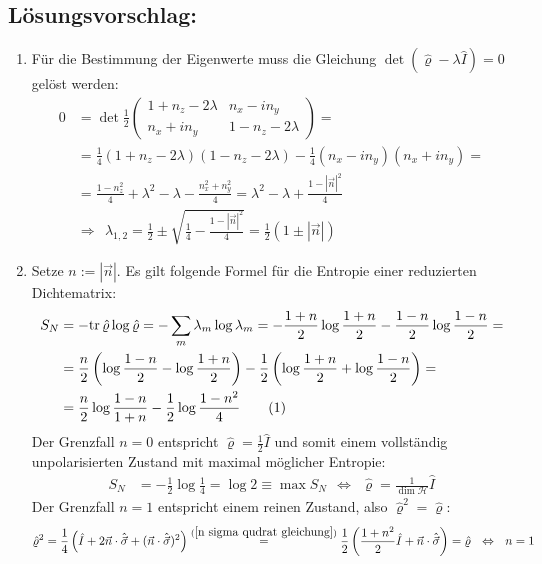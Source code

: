 \documentclass[a4paper,12pt]{article}
\newcommand\numberthis{\addtocounter{equation}{1}\tag{\theequation}}
\newcommand{\kla}{}
\newcommand{\tecxt}{}
\begin{document}
\subsection*{Lösungsvorschlag:}
\begin{enumerate}
\item[a)] Für die Bestimmung der Eigenwerte muss die Gleichung $\det (\hat{\varrho}-\lambda\hat{I})=0$ gelöst werden:
\begin{align*}
0&=\det\frac{1}{2}\begin{pmatrix}
1+n_z-2\lambda & n_x-in_y \\ n_x+in_y & 1-n_z-2\lambda
\end{pmatrix}=\\
&=\frac{1}{4}(1+n_z-2\lambda)(1-n_z-2\lambda)-\frac{1}{4}(n_x-in_y)(n_x+in_y)=\\
&=\frac{1-n_z^2}{4}+\lambda^2-\lambda -\frac{n_x^2+n_y^2}{4}=\lambda^2-\lambda +\frac{1-|\vec{n}|^2}{4}\\ 
&\Rightarrow\ \ \lambda_{1,2}=\frac{1}{2}\pm\sqrt{\frac{1}{4}-\frac{1-|\vec{n}|^2}{4}}=\frac{1}{2}\kla\left( {1\pm |\vec{n}|} \right)
\end{align*}
\item[b)] Setze $n:=|\vec{n}|$. Es gilt folgende Formel für die Entropie einer reduzierten Dichtematrix:
\begin{align*}
S_N&=-\tecxt\text{tr\,}\hat{\varrho}\log\hat{\varrho}=-\sum_m\lambda_m\log\lambda_m=-\frac{1+n}{2}\log\frac{1+n}{2}-\frac{1-n}{2}\log\frac{1-n}{2}=\\
&=\frac{n}{2}\kla\left( {\log\frac{1-n}{2}-\log\frac{1+n}{2}} \right)-\frac{1}{2}\kla\left( {\log\frac{1+n}{2}+\log\frac{1-n}{2}} \right)=\\
&=\frac{n}{2}\log\frac{1-n}{1+n}-\frac{1}{2}\log\frac{1-n^2}{4}\numberthis\label{Entropie}
\end{align*}
Der Grenzfall $n=0$ entspricht $\hat{\varrho}=\frac{1}{2}\hat{I}$ und somit einem vollständig unpolarisierten Zustand mit maximal möglicher Entropie:
\begin{align*}
S_N&=-\frac{1}{2}\log\frac{1}{4}=\log 2\equiv\max S_N\ \ \Leftrightarrow\ \ \hat{\varrho}=\frac{1}{\dim\mathcal{H}}\hat{I}
\end{align*}
Der Grenzfall $n=1$ entspricht einem reinen Zustand, also $\hat{\varrho}^2=\hat{\varrho}$:
\begin{align*}
\hat{\varrho}^2&=\frac{1}{4}\kla\left( {\hat{I}+2\vec{n}\cdot\hat{\vec{\sigma}}+(\vec{n}\cdot\hat{\vec{\sigma}})^2} \right)\overset{(\ref{n sigma qudrat gleichung})}{=}\frac{1}{2}\kla\left( {\frac{1+n^2}{2}\hat{I}+\vec{n}\cdot\hat{\vec{\sigma}}} \right)=\hat{\varrho}\ \ \Leftrightarrow\ \ n=1\\

\end{align*}
\end{enumerate}
\end{document}
